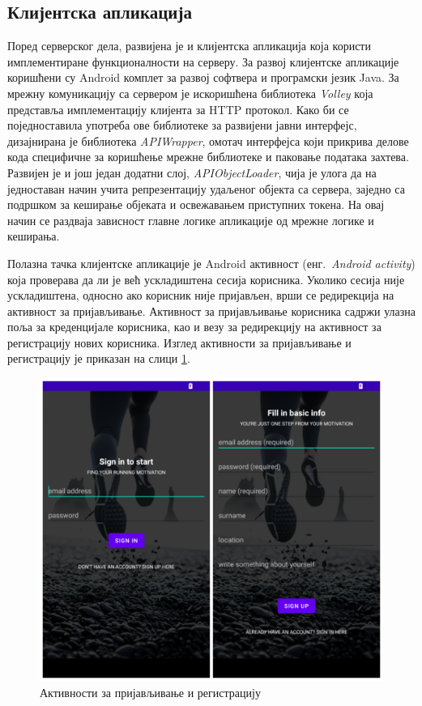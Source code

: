 \documentclass[12pt,oneside]{memoir}
\begin{document}
\subsection{Клијентска апликација}
Поред серверског дела, развијена је и клијентска апликација која користи имплементиране функционалности на серверу. За развој клијентске апликације коришћени су Android комплет за развој софтвера и програмски језик Java. За мрежну комуникацију са сервером је искоришћена библиотека \textit{Volley} \cite{volley} која представља имплементацију клијента за HTTP протокол. Како би се поједноставила употреба ове библиотеке за развијени јавни интерфејс, дизајнирана је библиотека \textit{APIWrapper}, омотач интерфејса који прикрива делове кода специфичне за коришћење мрежне библиотеке и паковање података захтева. Развијен је и још један додатни слој, \textit{APIObjectLoader}, чија је улога да на једноставан начин учита репрезентацију удаљеног објекта са сервера, заједно са подршком за кеширање објеката и освежавањем приступних токена. На овај начин се раздваја зависност главне логике апликације од мрежне логике и кеширања.

Полазна тачка клијентске апликације је Android активност (енг.~\textit{Android activity}) која проверава да ли је већ ускладиштена сесија корисника. Уколико сесија није ускладиштена, односно ако корисник није пријављен, врши се редирекција на активност за пријављивање. Активност за пријављивање корисника садржи улазна поља за креденцијале корисника, као и везу за редирекцију на активност за регистрацију нових корисника. Изглед активности за пријављивање и регистрацију је приказан на слици \ref{fig:registracija_logovanje}.

\begin{figure}[!ht]
  \centering
  \includegraphics[scale=0.7]{slike/registracija-logovanje.png}
  \caption{Активности за пријављивање и регистрацију}
  \label{fig:registracija_logovanje}
\end{figure}
\end{document}
